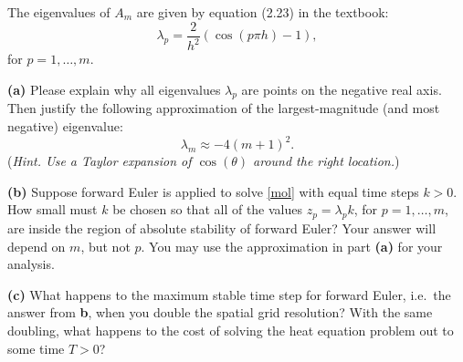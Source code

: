 \documentclass[12pt]{amsart}
\newcommand{\epart}[1]{\medskip\noindent\textbf{(#1)}\quad }
\begin{document}
The eigenvalues of $A_m$ are given by equation (2.23) in the textbook:
	$$\lambda_p = \frac{2}{h^2} \left(\cos(p\pi h) - 1\right),$$
for $p=1,\dots,m$.

\epart{a} Please explain why all eigenvalues $\lambda_p$ are points on the negative real axis.  Then justify the following approximation of the largest-magnitude (and most negative) eigenvalue:
	$$\lambda_m \approx - 4 (m+1)^2.$$
(\emph{Hint.  Use a Taylor expansion of $\cos(\theta)$ around the right location.})

\epart{b}  Suppose forward Euler is applied to solve \eqref{mol} with equal time steps $k>0$.  How small must $k$ be chosen so that all of the values $z_p=\lambda_p k$, for $p=1,\dots,m$, are inside the region of absolute stability of forward Euler?  Your answer will depend on $m$, but not $p$.  You may use the approximation in part \textbf{(a)} for your analysis.

\epart{c}  What happens to the maximum stable time step for forward Euler, i.e.~the answer from \textbf{b}, when you double the spatial grid resolution?  With the same doubling, what happens to the cost of solving the heat equation problem out to some time $T>0$?
\end{document}
